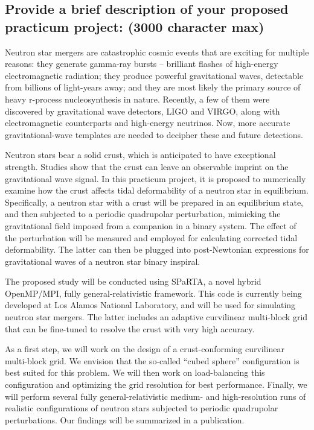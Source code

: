 \documentclass[12pt]{article}
\begin{document}
\subsection*{Provide a brief description of your proposed practicum project:
(3000 character max)}


Neutron star mergers are catastrophic cosmic events that are exciting for
multiple reasons: they generate gamma-ray bursts -- brilliant flashes of 
high-energy electromagnetic radiation; they produce powerful gravitational
waves, detectable from billions of light-years away; and they are most likely
the primary source of heavy r-process nucleosynthesis in nature. Recently, a
few of them were discovered by gravitational wave detectors, LIGO and VIRGO, along with
electromagnetic counterparts and high-energy neutrinos.
Now, more accurate gravitational-wave templates are needed to decipher these
and future detections.

Neutron stars bear a solid crust, which is anticipated to have exceptional
strength. Studies show that the crust can leave an observable imprint on the
gravitational wave signal. In this practicum project, it is proposed to
numerically examine how the crust affects tidal deformability of a neutron star 
in equilibrium. Specifically, a neutron star with a crust will be prepared in
an equilibrium state, and then subjected to a periodic quadrupolar perturbation,
mimicking the gravitational field imposed from a companion in a binary system. The effect of the
perturbation will be measured and employed for calculating corrected tidal
deformability. The latter can then be plugged into post-Newtonian
expressions for gravitational waves of a neutron star binary inspiral.

The proposed study will be conducted using SPaRTA, a novel hybrid OpenMP/MPI,
fully general-relativistic framework. This code is currently being developed
at Los Alamos National Laboratory, and will be used for simulating neutron
star mergers. The latter includes an adaptive curvilinear multi-block grid that
can be fine-tuned to resolve the crust with very high accuracy.

As a first step, we will work on the design of a crust-conforming
curvilinear multi-block grid. We envision that the so-called ``cubed sphere''
configuration is best suited for this problem. We will then work on
load-balancing this configuration and optimizing the grid resolution for best
performance. Finally, we will perform several fully general-relativistic 
medium- and high-resolution runs of realistic configurations of neutron stars 
subjected to periodic quadrupolar perturbations. Our findings will be
summarized in a publication.
\end{document}
